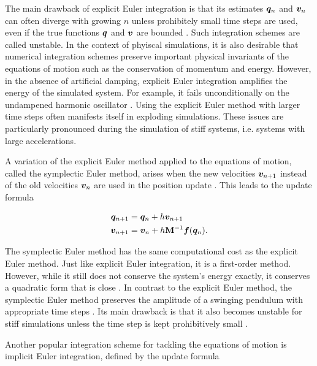 The main drawback of explicit Euler integration is that its estimates $\bm{q}_n$ and $\bm{v}_n$ can often diverge with growing $n$ unless 
prohibitely small time steps are used, even if the true functions $\bm{q}$ and $\bm{v}$ are bounded \cite{chapra2005}. Such integration schemes 
are called unstable. In the context of phyiscal simulations, it is also desirable that numerical integration schemes preserve important physical 
invariants of the equations of motion such as the conservation of momentum and energy. However, in the absence of artificial damping, explicit
Euler integration amplifies the energy of the simulated system. For example, it fails unconditionally on the undampened harmonic oscillator 
\cite{servin2006}. Using the explicit Euler method with larger time steps often manifests itself in exploding
simulations. These issues are particularly pronounced during the simulation of stiff systems, i.e. systems with large accelerations.

A variation of the explicit Euler method applied to the equations of motion, called the symplectic Euler method, arises when the new 
velocities $\bm{v}_{n+1}$ instead of the old velocities $\bm{v}_n$ are used in the position update \cite{stern2006}. This leads to 
the update formula

\begin{align}
    \begin{split}\label{eq:symplectic-euler}
        \bm{q}_{n+1} &= \bm{q}_n + h\bm{v}_{n+1}\\
        \bm{v}_{n+1} &= \bm{v}_n + h\mathbf{M}^{-1}\bm{f}(\bm{q}_n).
    \end{split}
\end{align}

\noindent The symplectic Euler method has the same computational cost as the explicit Euler method. Just like explicit Euler integration, it 
is a first-order method. However, while it still does not conserve the system's energy exactly, it conserves a quadratic form that is close 
\cite{servin2006}. In contrast to the explicit Euler method, the symplectic Euler method preserves the amplitude of a swinging pendulum with 
appropriate time steps \cite{stern2006}. Its main drawback is that it also becomes unstable for stiff simulations unless the time step is 
kept prohibitively small \cite{servin2006}. 

Another popular integration scheme for tackling the equations of motion is implicit Euler integration, defined by the update formula

